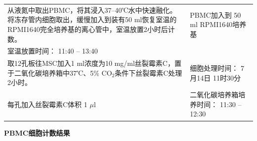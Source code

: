\documentclass[UTF8,10pt,a4paper,fontset=fandol]{ctexart}
\newcommand{\fieldvalue}[1]{#1}
\newcommand{\handwritten}[1]{#1}
\begin{document}
\begin{center}
\begin{center}
\noindent
\begin{tabularx}{\textwidth}{|p{}|X|}
\hline
从液氮中取出PBMC，将其浸入37--40℃水中快速融化。将冻存管内细胞取出，缓慢加入到装有50 ml恢复室温的RPMI1640完全培养基的离心管中，室温放置2小时后计数。&
PBMC加入到
\fieldvalue{\handwritten{50}} ml RPMI1640培养基\\
室温放置时间：
\fieldvalue{\handwritten{11:40}} --
\fieldvalue{\handwritten{13:40}}\\
\hline
取12孔板往MSC加入1 ml浓度为10 mg/ml丝裂霉素C，置于二氧化碳培养箱中37℃、5\% CO$_2$条件下丝裂霉素C处理2小时。&
细胞处理时间：
\fieldvalue{\handwritten{7月14日}}
\fieldvalue{\handwritten{11时30分}}\\
每孔加入丝裂霉素C体积
\fieldvalue{\handwritten{1}} $\mu$l &
二氧化碳培养箱培养时间：
\fieldvalue{\handwritten{11:30}} --
\fieldvalue{\handwritten{12:30}}\\
\hline
\end{tabularx}

\begin{center}
\textbf{PBMC细胞计数结果}
\end{center}


\end{center}
\end{center}
\end{document}
